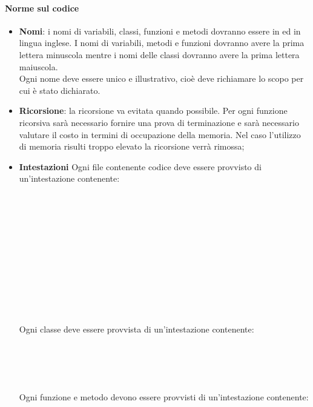 \paragraph{Norme sul codice}
\begin{itemize}
	\item \textbf{Nomi}: i nomi di variabili, classi, funzioni e metodi dovranno essere in  ed in lingua inglese. I nomi di variabili, metodi e funzioni dovranno avere la prima lettera minuscola mentre i nomi delle classi dovranno avere la prima lettera maiuscola.\\ Ogni nome deve essere unico e illustrativo, cioè deve richiamare lo scopo per cui è stato dichiarato.
	\item \textbf{Ricorsione}: la ricorsione va evitata quando possibile. Per ogni funzione ricorsiva sarà necessario fornire una prova di terminazione e sarà necessario valutare il costo in termini di occupazione della memoria. Nel caso l’utilizzo di memoria risulti troppo elevato la ricorsione verrà rimossa;
	\item \textbf{Intestazioni} \Spazio 
	Ogni file contenente codice deve essere provvisto di un'intestazione contenente:

	\code{/*} \\
	 \\
	 \\
	 \\
	 \\
	 \\
	 \\
	\\\\
	\\
	\code{*/} \\

Ogni classe deve essere provvista di un'intestazione contenente:

	\code{/*} \\
	 \\
	 \\
	\code{*/}\\

Ogni funzione e metodo devono essere provvisti di un'intestazione contenente:

	\code{/*} \\
	 \\
	 \\
	 \\
	\code{*/}\\


\end{itemize}
